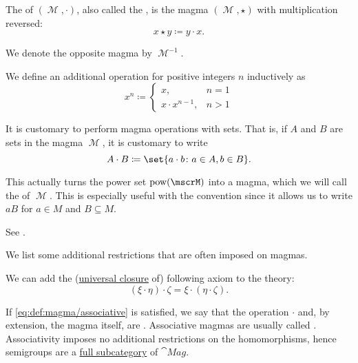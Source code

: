\begin{definition}
\begin{thmenum}[series=def:magma]
     The  of \( (\mscrM, \cdot) \), also called the , is the magma \( (\mscrM, \star) \) with multiplication reversed:
    \begin{equation*}
      x \star y \coloneqq y \cdot x.
    \end{equation*}

    We denote the opposite magma by \( \mscrM^{-1} \).

     We define an additional  operation for positive integers \( n \) inductively as
    \begin{equation}\label{eq:def:magma/exponentiation}
      x^n \coloneqq \begin{cases}
        x,               & n = 1 \\
        x \cdot x^{n-1}, & n > 1
      \end{cases}
    \end{equation}

     It is customary to perform magma operations with sets. That is, if \( A \) and \( B \) are sets in the magma \( \mscrM \), it is customary to write
    \begin{equation*}
      A \cdot B \coloneqq \set{ a \cdot b \colon a \in A, b \in B }.
    \end{equation*}

    This actually turns the power set \( \pow(\mscrM) \) into a magma, which we will call the  of \( \mscrM \). This is especially useful with the convention  since it allows us to write \( aB \) for \( a \in M \) and \( B \subseteq M \).

    See .
  \end{thmenum}

  We list some additional restrictions that are often imposed on magmas.
  \begin{thmenum}[resume=def:magma]
     We can add the (\hyperref[thm:implicit_universal_quantification]{universal closure} of) following axiom to the theory:
    \begin{equation}\label{eq:def:magma/associative}
      (\xi \cdot \eta) \cdot \zeta = \xi \cdot (\eta \cdot \zeta).
    \end{equation}

    If \eqref{eq:def:magma/associative} is satisfied, we say that the operation \( \cdot \) and, by extension, the magma itself, are . Associative magmas are usually called . Associativity imposes no additional restrictions on the homomorphisms, hence semigroups are a \hyperref[def:subcategory]{full subcategory} of \( \cat{Mag} \).


\end{thmenum}
\end{definition}
